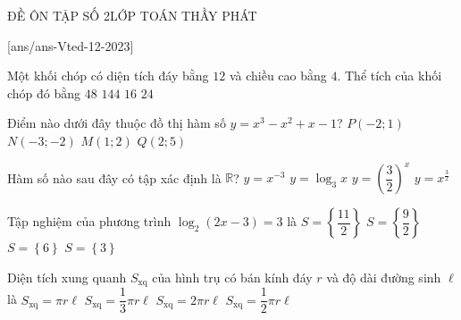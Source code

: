 \begin{name}
	{\tenchude}{ĐỀ ÔN TẬP SỐ 2}{LỚP TOÁN THẦY PHÁT}{\thoigian}
\end{name}
[ans/ans-Vted-12-2023]

\begin{ex}%
	Một khối chóp có diện tích đáy bằng $12$ và chiều cao bằng $4$. Thể tích của khối chóp đó bằng
	\choice
	{$48$}
	{$144$}
	{\True $16$}
	{$24$}
\end{ex}
\begin{ex}%
	Điểm nào dưới đây thuộc đồ thị hàm số $y=x^3-x^2+x-1$?
	\choice
	{$P(-2;1)$}
	{$N(-3;-2)$}
	{$M(1;2)$}
	{\True $Q(2;5)$}
\end{ex}
\begin{ex}%
	Hàm số nào sau đây có tập xác định là $\mathbb{R}$?
	\choice
	{$y=x^{-3}$}
	{$y=\log_3 x$}
	{\True $y=\left(\dfrac{3}{2}\right)^x$}
	{$y=x^{\tfrac{3}{2}}$}
\end{ex}
\begin{ex}%
	Tập nghiệm của phương trình $\log_2(2x-3)=3$ là
	\choice
	{\True $S=\left\lbrace \dfrac{11}{2}\right\rbrace$}
	{$S=\left\lbrace \dfrac{9}{2}\right\rbrace$}
	{$S=\left\lbrace 6\right\rbrace$}
	{$S=\left\lbrace 3\right\rbrace$}
\end{ex}
\begin{ex}%
	Diện tích xung quanh $S_{\text{xq}}$ của hình trụ có bán kính đáy $r$ và độ dài đường sinh $\ell$ là
	\choice
	{$S_{\text{xq}}=\pi r\ell$}
	{$S_{\text{xq}}=\dfrac{1}{3}\pi r\ell$}
	{\True $S_{\text{xq}}=2\pi r\ell$}
	{$S_{\text{xq}}=\dfrac{1}{2}\pi r\ell$}
\end{ex}
